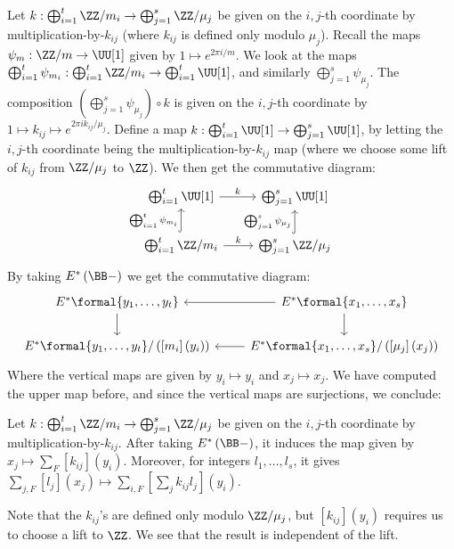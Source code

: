Let $k: \bigoplus_{i=1}^t \ZZ/m_i \to \bigoplus_{j=1}^s \ZZ/\mu_j$ be given on the $i,j$-th coordinate by multiplication-by-$k_{ij}$ (where $k_{ij}$ is defined only modulo $\mu_j$).
Recall the maps $\psi_m: \ZZ/m \to \UU[1]$ given by $1 \mapsto e^{2\pi i/m}$.
We look at the maps $\bigoplus_{i=1}^t \psi_{m_i}: \bigoplus_{i=1}^t \ZZ/m_i \to \bigoplus_{i=1}^t \UU[1]$, and similarly $\bigoplus_{j=1}^s \psi_{\mu_j}$.
The composition $\left(\bigoplus_{j=1}^s \psi_{\mu_j}\right) \circ k$ is given on the $i,j$-th coordinate by
$
1
\mapsto k_{ij}
\mapsto e^{2\pi ik_{ij}/\mu_j}
$.
Define a map $k: \bigoplus_{i=1}^t \UU[1] \to \bigoplus_{j=1}^s \UU[1]$, by letting the $i,j$-th coordinate being the multiplication-by-$k_{ij}$ map (where we choose some lift of $k_{ij}$ from $\ZZ/\mu_j$ to $\ZZ$).
We then get the commutative diagram:
$$
\begin{tikzcd}
	\bigoplus_{i=1}^t \UU[1] \arrow{r}{k} & \bigoplus_{j=1}^s \UU[1] \\
	\bigoplus_{i=1}^t \ZZ/m_i \arrow[hook]{u}{\bigoplus_{i=1}^t \psi_{m_i}} \arrow{r}{k} & \bigoplus_{j=1}^s \ZZ/\mu_j \arrow[hook]{u}{\bigoplus_{j=1}^s \psi_{\mu_j}}
\end{tikzcd}
$$
By taking $E^*\left(\BB-\right)$ we get the commutative diagram:
$$
\begin{tikzcd}
	E^*\formal{y_1, \dotsc, y_t} \arrow{d}{} & E^*\formal{x_1, \dotsc, x_s} \arrow{d}{} \arrow{l}{} \\
	E^*\formal{y_1, \dotsc, y_t}/\left(\left[m_i\right]\left(y_i\right)\right) & E^*\formal{x_1, \dotsc, x_s}/\left(\left[\mu_j\right]\left(x_j\right)\right) \arrow{l}{}
\end{tikzcd}
$$
Where the vertical maps are given by $y_i \mapsto y_i$ and $x_j \mapsto x_j$.
We have computed the upper map before, and since the vertical maps are surjections, we conclude:

\begin{proposition}\label{E-B-map-cyclic}
	Let $k: \bigoplus_{i=1}^t \ZZ/m_i \to \bigoplus_{j=1}^s \ZZ/\mu_j$ be given on the $i,j$-th coordinate by multiplication-by-$k_{ij}$.
	After taking $E^*\left(\BB-\right)$, it induces the map given by $x_j \mapsto \sum_F\left[k_{ij}\right]\left(y_i\right)$.
	Moreover, for integers $l_1, \dotsc, l_s$, it gives $\sum_{j,F}\left[l_j\right]\left(x_j\right) \mapsto \sum_{i,F}\left[\sum_j k_{ij} l_j\right]\left(y_i\right)$.
\end{proposition}

\begin{remark}
	Note that the $k_{ij}$'s are defined only modulo $\ZZ/\mu_j$, but $\left[k_{ij}\right]\left(y_i\right)$ requires us to choose a lift to $\ZZ$.
	We see that the result is independent of the lift.
\end{remark}



